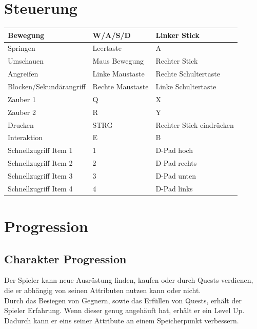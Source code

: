 \documentclass[envcountsame,envcountchap deutsch]{i-studis}
\begin{document}
	\section{Steuerung}
	\begin{table}[]
		\centering
		\begin{tabular}{|l|l|l|}
			\hline
			Bewegung                & W/A/S/D          & Linker Stick             \\ \hline
			Springen                & Leertaste        & A                        \\ \hline
			Umschauen               & Maus Bewegung    & Rechter Stick            \\ \hline
			Angreifen               & Linke Maustaste  & Rechte Schultertaste     \\ \hline
			Blocken/Sekundärangriff & Rechte Maustaste & Linke Schultertaste      \\ \hline
			Zauber 1                & Q                & X                        \\ \hline
			Zauber 2                & R                & Y                        \\ \hline
			Drucken                 & STRG             & Rechter Stick eindrücken \\ \hline
			Interaktion             & E                & B                        \\ \hline
			Schnellzugriff Item 1   & 1                & D-Pad hoch               \\ \hline
			Schnellzugriff Item 2   & 2                & D-Pad rechts             \\ \hline
			Schnellzugriff Item 3   & 3                & D-Pad unten              \\ \hline
			Schnellzugriff Item 4   & 4                & D-Pad links              \\ \hline
		\end{tabular}
	\end{table}
	\pagebreak
	\section{Progression}
		\subsection{Charakter Progression}
		Der Spieler kann neue Ausrüstung finden, kaufen oder durch Quests verdienen, die er abhängig von seinen
		Attributen nutzen kann oder nicht.\\
		Durch das Besiegen von Gegnern, sowie das Erfüllen von Quests, erhält der Spieler Erfahrung. Wenn dieser
		genug angehäuft hat, erhält er ein Level Up. Dadurch kann er eins seiner Attribute an einem Speicherpunkt
		verbessern. 
\end{document}

